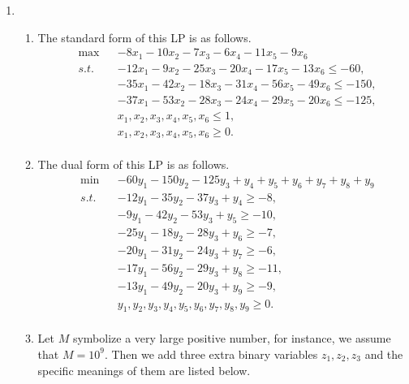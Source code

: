 \documentclass[12pt,a4paper]{article}
\makeatletter
\newtheorem*{solution}{Solution}
\theoremstyle{definition}
\renewenvironment{solution}[1][Solution] {\par\pushQED{\qed}\normalfont\topsep6\p@\@plus6\p@\relax\trivlist\item[\hskip\labelsep\bfseries#1\@addpunct{.}]\ignorespaces}{\popQED\endtrivlist\@endpefalse} \makeatother
\makeatother
\begin{document}
\begin{enumerate}
\begin{solution}
\begin{enumerate}
    \item The standard form of this LP is as follows.
        \begin{displaymath}
        \begin{aligned}
        & \max && -8 x_1 - 10 x_2 - 7 x_3 - 6 x_4 - 11 x_5 - 9 x_6 \\
        & s.t. && -12 x_1 - 9 x_2 - 25 x_3 - 20 x_4 - 17 x_5 - 13 x_6  \leq -60, \\
 		&      && -35 x_1 - 42 x_2 - 18 x_3 - 31 x_4 - 56 x_5 - 49 x_6 \leq -150, \\
 		&      && -37 x_1 - 53 x_2 - 28 x_3 - 24 x_4 - 29 x_5 - 20 x_6 \leq -125, \\
        &      && x_1, x_2, x_3, x_4, x_5, x_6                        \leq 1, \\
        &      && x_1, x_2, x_3, x_4, x_5, x_6                        \geq 0. \\
        \end{aligned}
        \end{displaymath}

    \item The dual form of this LP is as follows.
    \begin{displaymath}
    \begin{aligned}
    & \min && -60 y_1 - 150 y_2 - 125 y_3 + y_4 + y_5 + y_6 + y_7 + y_8 + y_9 \\
    & s.t. && -12 y_1 - 35 y_2 - 37 y_3 + y_4 \geq -8, \\
    &      && -9 y_1 - 42 y_2 - 53 y_3 + y_5 \geq -10, \\
    &      && -25 y_1 - 18 y_2 - 28 y_3 + y_6 \geq -7, \\
    &      && -20 y_1 - 31 y_2 - 24 y_3 + y_7 \geq -6, \\
    &      && -17 y_1 - 56 y_2 - 29 y_3 + y_8 \geq -11, \\
    &      && -13 y_1 - 49 y_2 - 20 y_3 + y_9 \geq -9, \\
    &      && y_1,y_2,y_3,y_4,y_5,y_6,y_7,y_8,y_9 \geq 0. \\
    \end{aligned}
    \end{displaymath}

    \item Let $M$ symbolize a very large positive number, for instance, we assume that $M = 10^9$. Then we add three extra binary variables $z_1, z_2, z_3$ and the specific meanings of them are listed below.
        \begin{table}[h]
		\footnotesize
		\centering
	    \label{standards}
	    \renewcommand\arraystretch{1.1}
		\begin{tabular}{lc}
			

\end{tabular}
\end{table}
\end{enumerate}
\end{solution}
\end{enumerate}
\end{document}
